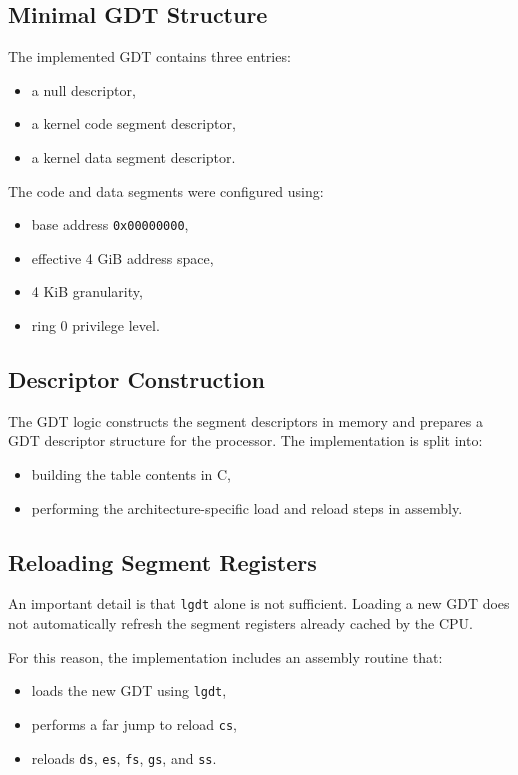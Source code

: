 \subsection{Minimal GDT Structure}
The implemented GDT contains three entries:
\begin{itemize}
  \item a null descriptor,
  \item a kernel code segment descriptor,
  \item a kernel data segment descriptor.
\end{itemize}

The code and data segments were configured using:
\begin{itemize}
  \item base address \texttt{0x00000000},
  \item effective 4 GiB address space,
  \item 4 KiB granularity,
  \item ring 0 privilege level.
\end{itemize}

\subsection{Descriptor Construction}
The GDT logic constructs the segment descriptors in memory and prepares a GDT descriptor structure for the processor. The implementation is split into:
\begin{itemize}
  \item building the table contents in C,
  \item performing the architecture-specific load and reload steps in assembly.
\end{itemize}

\subsection{Reloading Segment Registers}
An important detail is that \texttt{lgdt} alone is not sufficient. Loading a new GDT does not automatically refresh the segment registers already cached by the CPU.

For this reason, the implementation includes an assembly routine that:
\begin{itemize}
  \item loads the new GDT using \texttt{lgdt},
  \item performs a far jump to reload \texttt{cs},
  \item reloads \texttt{ds}, \texttt{es}, \texttt{fs}, \texttt{gs}, and \texttt{ss}.
\end{itemize}

